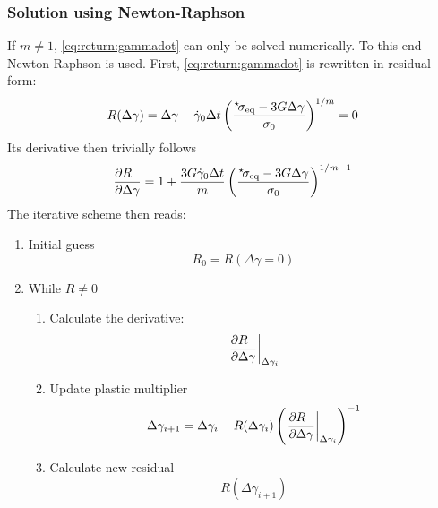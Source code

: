 \documentclass[times,namecite]{goose-article}
\newcommand\leftstar[1]{\hspace*{-.3em}~^\star\!#1}
\begin{document}
\subsubsection{Solution using Newton-Raphson}

If $m \neq 1$, \eqref{eq:return:gammadot} can only be solved numerically. To this end Newton-Raphson is used. First, \eqref{eq:return:gammadot} is rewritten in residual form:
%
\begin{equation}
  R ( \Delta \gamma )
  =
  \Delta \gamma - \dot{\gamma}_0 \Delta t
  \left(
    \frac{
      \leftstar{\sigma}_\mathrm{eq} - 3 G \Delta \gamma
    }{
      \sigma_0
    }
  \right)^{1/m}
  =
  0
\end{equation}
%
Its derivative then trivially follows
%
\begin{equation}
  \frac{\partial R \hfill}{\partial \Delta \gamma \hfill} =
  1 + \frac{ 3 G \dot{\gamma}_0 \Delta t }{m}
  \left(
    \frac{
      \leftstar{\sigma}_\mathrm{eq} - 3 G \Delta \gamma
    }{
      \sigma_0
    }
  \right)^{1/m-1}
\end{equation}
%
The iterative scheme then reads:

\begin{enumerate}
%
\item Initial guess
%
\begin{equation}
  R_0 = R ( \Delta \gamma = 0 )
\end{equation}
%
\item While \(R \neq 0\)
%
\begin{enumerate}
%
\item Calculate the derivative:
%
\begin{equation}
\left.
    \frac{\partial R \hfill}{\partial \Delta \gamma \hfill}
    \right|_{\Delta \gamma_i}
\end{equation}
%
\item Update plastic multiplier
%
\begin{equation}
  \Delta \gamma_{i+1} = \Delta \gamma_i -
  R(\Delta \gamma_i)
  \left( \left.
    \frac{\partial R \hfill}{\partial \Delta \gamma \hfill}
  \right|_{\Delta \gamma_i} \right)^{-1}
\end{equation}
%
\item Calculate new residual
%
\begin{equation}
  R( \Delta \gamma_{i+1} )
\end{equation}
%
\end{enumerate}
%
\end{enumerate}
\end{document}

